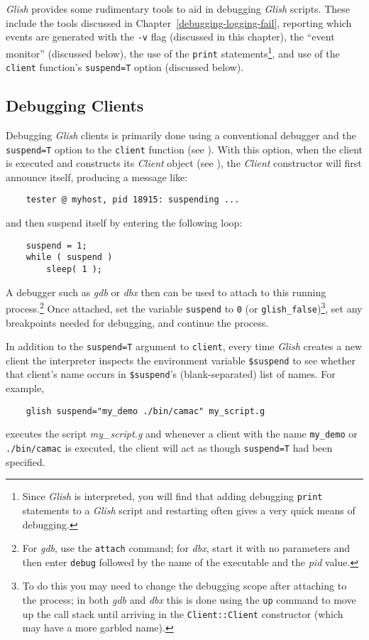 \begin{sloppy}
\label{debugging-clients}
{\em Glish} provides some rudimentary tools to aid in debugging {\em Glish} scripts.
These include the tools discussed in Chapter~\ref{debugging-logging-fail},
reporting which events are generated with the \verb+-v+ flag (discussed in this chapter),
the ``event monitor'' (discussed below), the use of the {\tt print} statements\footnote{
Since {\em Glish} is interpreted, you will find that adding debugging {\tt print}
statements to a {\em Glish} script and restarting often gives a very quick
means of debugging.}, and use of the {\tt client} function's {\tt suspend=T}
option (discussed below).

\subsection{Debugging Clients}

Debugging {\em Glish} clients is primarily done using a conventional
debugger and the {\tt suspend=T} option to the {\tt client}
function (see ).  With this option, when the
client is executed and constructs its {\em Client} object (see
), the {\em Client} constructor will
first announce itself, producing a message like:
\begin{verbatim}
    tester @ myhost, pid 18915: suspending ...
\end{verbatim}
and then suspend itself by entering the following loop:
\begin{verbatim}
    suspend = 1;
    while ( suspend )
        sleep( 1 );
\end{verbatim}
A debugger such as {\em gdb} or {\em dbx} then can be used to attach
to this running process.\footnote{For {\em gdb}, use the {\tt attach}
command; for {\em dbx}, start it with no parameters and then enter
{\tt debug} followed by the name of the executable and the {\em pid} value.}
Once attached, set the variable
{\tt suspend} to {\tt 0} (or {\tt glish\_false})\footnote{To do this you
may need to change the debugging scope after attaching to the process;
in both {\em gdb} and {\em dbx} this is done using the {\tt up} command
to move up the call stack until arriving in the {\tt Client::Client}
constructor (which may have a more garbled name).}, set any breakpoints
needed for debugging, and continue the process.

In addition to the {\tt suspend=T} argument to {\tt client}, every time
{\em Glish} creates a new client the interpreter inspects the environment
variable {\tt \$suspend} to see whether that client's name occurs in
{\tt \$suspend}'s (blank-separated) list of names.  For example,
\begin{verbatim}
    glish suspend="my_demo ./bin/camac" my_script.g
\end{verbatim}
executes the script {\em my\_script.g} and whenever a client
with the name {\tt my\_demo} or {\tt ./bin/camac} is executed,
the client will act as though {\tt suspend=T} had been specified.


\end{sloppy}

